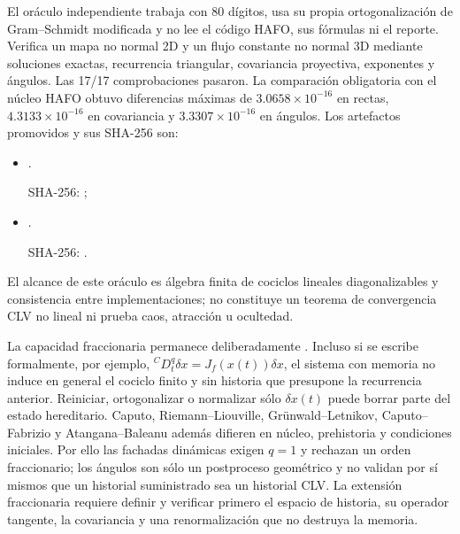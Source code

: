 El oráculo independiente
 trabaja con
80 dígitos, usa su propia ortogonalización de Gram--Schmidt modificada y no lee
el código HAFO, sus fórmulas ni el reporte. Verifica un mapa no normal 2D y un
flujo constante no normal 3D mediante soluciones exactas, recurrencia
triangular, covariancia proyectiva, exponentes y ángulos. Las 17/17
comprobaciones pasaron. La comparación obligatoria con el núcleo HAFO obtuvo
diferencias máximas de $3.0658\times10^{-16}$ en rectas,
$4.3133\times10^{-16}$ en covariancia y $3.3307\times10^{-16}$ en ángulos.
Los artefactos promovidos y sus SHA-256 son:
\begin{itemize}
  \item
  .
  \par\noindent SHA-256:
  ;
  \item
  .
  \par\noindent SHA-256:
  .
\end{itemize}
El alcance de este oráculo es álgebra finita de cociclos lineales
diagonalizables y consistencia entre implementaciones; no constituye un
teorema de convergencia CLV no lineal ni prueba caos, atracción u ocultedad.

La capacidad fraccionaria permanece deliberadamente
. Incluso si se escribe formalmente, por ejemplo,
${}^{C}D_t^q\delta x=J_f(x(t))\delta x$, el sistema con memoria no induce en
general el cociclo finito y sin historia que presupone la recurrencia anterior.
Reiniciar, ortogonalizar o normalizar sólo $\delta x(t)$ puede borrar parte del
estado hereditario. Caputo, Riemann--Liouville, Grünwald--Letnikov,
Caputo--Fabrizio y Atangana--Baleanu además difieren en núcleo, prehistoria y
condiciones iniciales. Por ello las fachadas dinámicas exigen $q=1$ y rechazan
un orden fraccionario; los ángulos son sólo un postproceso geométrico y no
validan por sí mismos que un historial suministrado sea un historial CLV. La
extensión fraccionaria requiere definir y verificar primero el espacio de
historia, su operador tangente, la covariancia y una renormalización que no
destruya la memoria.

